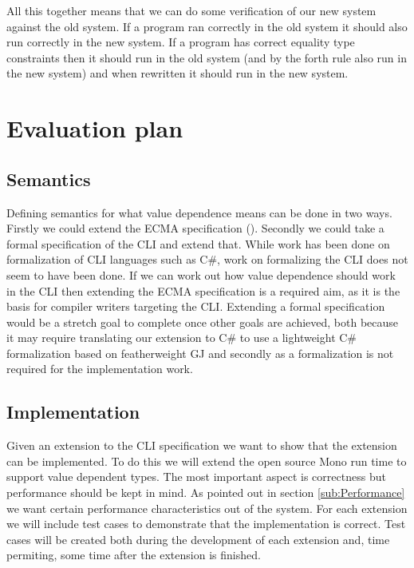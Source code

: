 \documentclass[english]{report}
\begin{document}
All this together means that we can do some verification of our new system
against the old system. If a program ran correctly in the old system it should
also run correctly in the new system. If a program has correct equality type
constraints then it should run in the old system (and by the forth rule also
run in the new system) and when rewritten it should run in the new system.


\chapter{Evaluation plan}


\section{Semantics}

Defining semantics for what value dependence means can be done in
two ways. Firstly we could extend the ECMA specification (\cite{ecma-335}).
Secondly we could take a formal specification of the CLI and extend
that. While work has been done on formalization of CLI languages such
as C\#, work on formalizing the CLI does not seem to have been done.
If we can work out how value dependence should work in the CLI then
extending the ECMA specification is a required aim, as it is the basis
for compiler writers targeting the CLI. Extending a formal specification
would be a stretch goal to complete once other goals are achieved,
both because it may require translating our extension to C\# to use
a lightweight C\# formalization based on featherweight GJ and secondly
as a formalization is not required for the implementation work.


\section{Implementation}

Given an extension to the CLI specification we want to show that the
extension can be implemented. To do this we will extend the open source
Mono run time to support value dependent types. The most important
aspect is correctness but performance should be kept in mind. As pointed
out in section \ref{sub:Performance} we want certain performance
characteristics out of the system. For each extension we will include
test cases to demonstrate that the implementation is correct. Test
cases will be created both during the development of each extension
and, time permiting, some time after the extension is finished.





\end{document}
